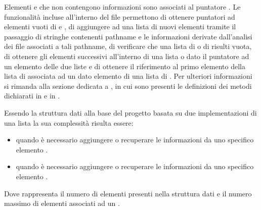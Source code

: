 \documentclass[letterpaper,10pt,italian,openany,oneside]{sphinxmanual}
\begin{document}
Elementi  e  che non contengono informazioni sono associati al puntatore .
Le funzionalità incluse all’interno del file  permettono di ottenere puntatori ad elementi vuoti di  e , di aggiungere ad una lista di 
nuovi elementi tramite il passaggio di stringhe contenenti pathname e le informazioni derivate dall’analisi dei file associati a tali pathname, di verificare che una lista di 
o di  risulti vuota, di ottenere gli elementi successivi all’interno di una lista  o  dato il puntatore ad un elemento delle due liste e di ottenere
il riferimento al primo elemento della lista di  associata ad un dato elemento di una lista di .
Per ulteriori informazioni si rimanda alla sezione dedicata a , in cui sono presenti le definizioni dei metodi dichiarati in  e in .

Essendo la struttura dati alla base del progetto basata su due implementazioni di una lista la sua complessità risulta essere:
\begin{itemize}
\item {} 
 quando è necessario aggiungere o recuperare le informazioni da uno specifico elemento .

\item {} 
 quando è necessario aggiungere o recuperare le informazioni da uno specifico elemento .

\end{itemize}

Dove  rappresenta il numero di elementi  presenti nella struttura dati e  il numero massimo di elementi  associati ad un .
\end{document}
